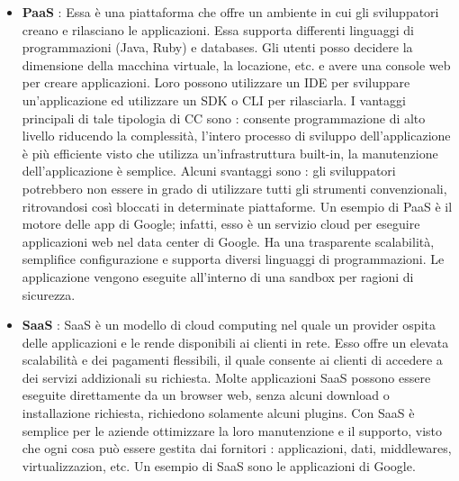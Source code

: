\documentclass[12pt]{report}
\begin{document}
\begin{itemize}
\item \textbf{PaaS} : Essa è una piattaforma che offre un ambiente in cui gli sviluppatori creano e rilasciano le applicazioni. Essa supporta differenti linguaggi di programmazioni (Java, Ruby) e databases. Gli utenti posso decidere la dimensione della macchina virtuale, la locazione, etc. e avere una console web per creare applicazioni. Loro possono utilizzare un IDE per sviluppare un'applicazione ed utilizzare un SDK o CLI per rilasciarla. I vantaggi principali di tale tipologia di CC sono : consente programmazione di alto livello riducendo la complessità, l'intero processo di sviluppo dell'applicazione è più efficiente visto che utilizza un'infrastruttura built-in, la manutenzione dell'applicazione è semplice. Alcuni svantaggi sono : gli sviluppatori potrebbero non essere in grado di utilizzare tutti gli strumenti convenzionali, ritrovandosi così bloccati in determinate piattaforme. Un esempio di PaaS è il motore delle app di Google; infatti, esso è un servizio cloud per eseguire applicazioni web nel data center di Google. Ha una trasparente scalabilità, semplifice configurazione e supporta diversi linguaggi di programmazioni. Le applicazione vengono eseguite all'interno di una sandbox per ragioni di sicurezza.
\item \textbf{SaaS} : SaaS è un modello di cloud computing nel quale un provider ospita delle applicazioni e le rende disponibili ai clienti in rete. Esso offre un elevata scalabilità e dei pagamenti flessibili, il quale consente ai clienti di accedere a dei servizi addizionali su richiesta. Molte applicazioni SaaS possono essere eseguite direttamente da un browser web, senza alcuni download o installazione richiesta, richiedono solamente alcuni plugins. Con SaaS è semplice per le aziende ottimizzare la loro manutenzione e il supporto, visto che ogni cosa può essere gestita dai fornitori : applicazioni, dati, middlewares, virtualizzazion, etc. Un esempio di SaaS sono le applicazioni di Google.
\end{itemize}
\end{document}
